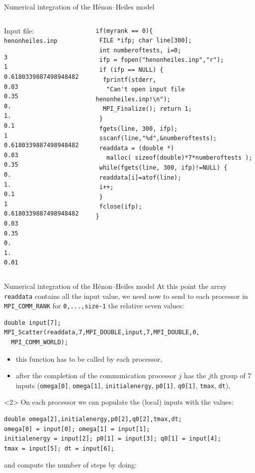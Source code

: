 \documentclass[xcolor={svgnames,usenames}]{beamer}
\begin{document}
\begin{frame}[fragile]{Numerical integration of the H\'enon--Heiles model}
\small
\begin{columns}
\begin{column}{0.25\textwidth}
\scriptsize
Input file: \texttt{henonheiles.inp}
\begin{verbatim}
3
1 
0.6180339887498948482
0.03
0.35
0.
1.
0.1
1
0.6180339887498948482
0.03
0.35
0.
1.
0.1
1 
0.6180339887498948482
0.03
0.35
0.
1.
0.01
\end{verbatim}
\end{column}
\begin{column}{0.75\textwidth}
\begin{verbatim}
if(myrank == 0){
 FILE *ifp; char line[300];
 int numberoftests, i=0;
 ifp = fopen("henonheiles.inp","r");
 if (ifp == NULL) {
  fprintf(stderr, 
   "Can't open input file henonheiles.inp!\n");
  MPI_Finalize(); return 1;
 }
 fgets(line, 300, ifp); 
 sscanf(line,"%d",&numberoftests);
 readdata = (double *) 
   malloc( sizeof(double)*7*numberoftests );
 while(fgets(line, 300, ifp)!=NULL) {
 readdata[i]=atof(line);
 i++;
 }
 fclose(ifp);
}
\end{verbatim}
\end{column}
\end{columns}
\end{frame}

\begin{frame}[fragile]{Numerical integration of the H\'enon--Heiles model}\small
At this point the array \texttt{readdata} contains all the input value, we need now to send to each processor in \texttt{MPI_COMM_RANK} for \texttt{0,...,size-1} the relative seven values:
\begin{verbatim}
double input[7];
MPI_Scatter(readdata,7,MPI_DOUBLE,input,7,MPI_DOUBLE,0,
  MPI_COMM_WORLD);
\end{verbatim}
\begin{itemize}
	\item this function has to be called by each processor,
	\item after the completion of the communication processor $j$ has the $j$th group of 7 inputs (\texttt{omega[0]}, \texttt{omega[1]}, \texttt{initialenergy}, \texttt{p0[1]}, \texttt{q0[1]}, \texttt{tmax}, \texttt{dt}),
\end{itemize}
\begin{onlyenv}<2>
\vspace{-0.3em}On each processor we can populate the (local) inputs with the values:
\begin{verbatim}
double omega[2],initialenergy,p0[2],q0[2],tmax,dt;
omega[0] = input[0]; omega[1] = input[1];
initialenergy = input[2]; p0[1] = input[3]; q0[1] = input[4];
tmax = input[5]; dt = input[6];
\end{verbatim}
\vspace{-0.3em}and compute the number of steps by doing: 
\end{onlyenv}
\end{frame}
\end{document}
